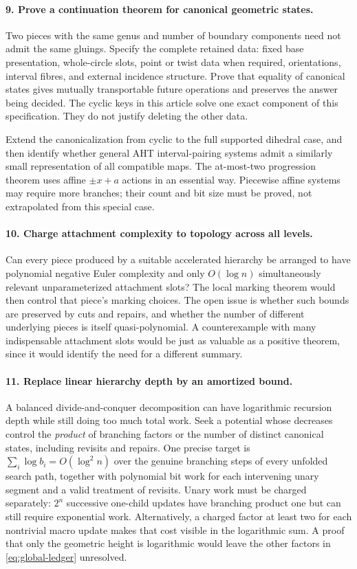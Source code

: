 \documentclass[11pt]{article}
\theoremstyle{definition}
\theoremstyle{remark}
\begin{document}
\paragraph{9. Prove a continuation theorem for canonical geometric states.}
Two pieces with the same genus and number of boundary components need
not admit the same gluings. Specify the complete retained data: fixed
base presentation, whole-circle slots, point or twist data when required,
orientations, interval fibres, and external incidence structure.
Prove that equality of canonical states gives mutually transportable
future operations and preserves the answer being decided. The cyclic
keys in this article solve one exact component of this specification.
They do not justify deleting the other data.

Extend the canonicalization from cyclic to the full supported dihedral
case, and then identify whether general AHT interval-pairing systems admit
a similarly small representation of all compatible maps. The at-most-two
progression theorem uses affine $\pm x+a$ actions in an essential way.
Piecewise affine systems may require more branches; their count and
bit size must be proved, not extrapolated from this special case.

\paragraph{10. Charge attachment complexity to topology across all levels.}
Can every piece produced by a suitable accelerated hierarchy be arranged
to have polynomial negative Euler complexity and only $O(\log n)$
simultaneously relevant unparameterized attachment slots? The local
marking theorem would then control that piece's marking choices.
The open issue is whether such bounds are preserved by cuts and repairs,
and whether the number of different underlying pieces is itself
quasi-polynomial. A counterexample with many indispensable attachment
slots would be just as valuable as a positive theorem, since it would
identify the need for a different summary.

\paragraph{11. Replace linear hierarchy depth by an amortized bound.}
A balanced divide-and-conquer decomposition can have logarithmic
recursion depth while still doing too much total work. Seek a potential
whose decreases control the \emph{product} of branching factors or the
number of distinct canonical states, including revisits and repairs.
One precise target is
$\sum_i\log b_i=O(\log^2 n)$ over the genuine branching steps of every
unfolded search path, together with polynomial bit work for each
intervening unary segment and a valid treatment of revisits. Unary work
must be charged separately: $2^n$ successive one-child updates have
branching product one but can still require exponential work.
Alternatively, a charged factor at least two for each nontrivial macro
update makes that cost visible in the logarithmic sum. A proof that only
the geometric height is logarithmic would leave the other factors in
\eqref{eq:global-ledger} unresolved.
\end{document}
